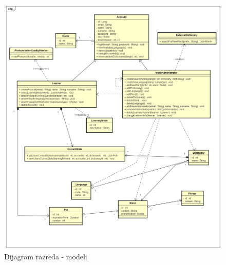 			\begin{figure}[H]
				\includegraphics[width=\textwidth]{slike/ClassDiagram1.PNG}
				\caption{Dijagram razreda - modeli}
				\label{fig:classDiagram1}
			\end{figure}
			
			\newpage
			
